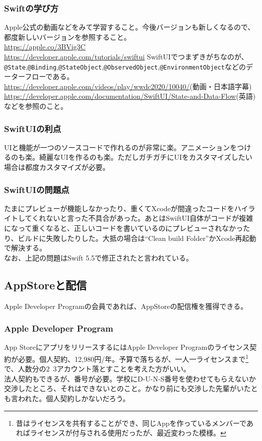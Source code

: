 \documentclass[a4paper]{ltjsreport}
\begin{document}
\subsubsection{Swiftの学び方}
Apple公式の動画などをみて学習すること。今後バージョンも新しくなるので、都度新しいバージョンを参照すること。\\
\url{https://apple.co/3BVig3C}\\
\url{https://developer.apple.com/tutorials/swiftui}
SwiftUIでつまずきがちなのが、\\
\verb|@State|,\verb|@Binding|,\verb|@StateObject|,\verb|@ObservedObject|,\verb|@EnvironmentObject|などのデーターフローである。\\
\url{https://developer.apple.com/videos/play/wwdc2020/10040/}(動画・日本語字幕)\\
\url{https://developer.apple.com/documentation/SwiftUI/State-and-Data-Flow}(英語)\\
などを参照のこと。
\subsubsection{SwiftUIの利点}
UIと機能が一つのソースコードで作れるのが非常に楽。アニメーションをつけるのも楽。綺麗なUIを作るのも楽。ただしガチガチにUIをカスタマイズしたい場合は都度カスタマイズが必要。
\subsubsection{SwiftUIの問題点}
たまにプレビューが機能しなかったり、重くてXcodeが間違ったコードをハイライトしてくれないと言った不具合があった。あとはSwiftUI自体がコードが複雑になって重くなると、正しいコードを書いているのにプレビューされなかったり、ビルドに失敗したりした。大抵の場合は``Clean build Folder''かXcode再起動で解決する。\\
なお、上記の問題はSwift 5.5で修正されたと言われている。
\subsection{AppStoreと配信}
Apple Developer Programの会員であれば、AppStoreの配信権を獲得できる。
\subsubsection{Apple Developer Program}
App StoreにアプリをリリースするにはApple Developer Programのライセンス契約が必要。個人契約、12,980円/年。予算で落ちるが、一人一ライセンスまで\footnote{昔はライセンスを共有することができ、同じAppを作っているメンバーであればライセンスが付与される使用だったが、最近変わった模様。}で、人数分の2~3アカウント落とすことを考えた方がいい。\\
法人契約もできるが、番号が必要。学校にD-U-N-S番号を使わせてもらえないか交渉したところ、それはできないとのこと。かなり前にも交渉した先輩がいたとも言われた。個人契約しかないだろう。
\end{document}
